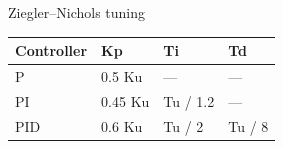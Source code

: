 \begin{frame}{Ziegler--Nichols tuning}
\begin{center}
\begin{tabular}{|l|l|l|l|}
\hline
Controller & Kp & Ti & Td \\ \hline
P & 0.5 Ku & --- & --- \\ \hline
PI & 0.45 Ku & Tu / 1.2 & --- \\ \hline
PID & 0.6 Ku & Tu / 2 & Tu / 8 \\ \hline
\end{tabular}
\end{center}
\end{frame}

